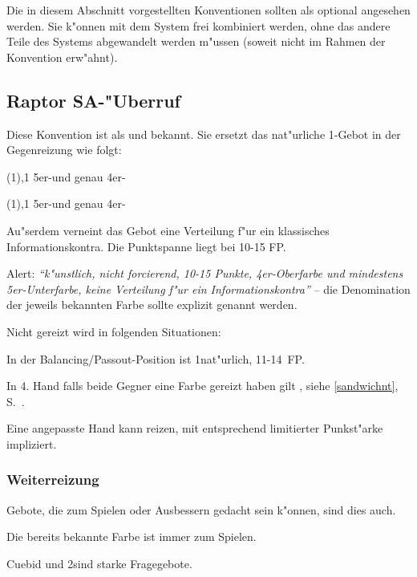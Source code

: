 \begin{appendix}
Die in diesem Abschnitt vorgestellten Konventionen sollten als optional
angesehen werden.  Sie k"onnen mit dem System frei kombiniert werden, ohne das
andere Teile des Systems abgewandelt werden m"ussen (soweit nicht im Rahmen der
Konvention erw"ahnt).

\subsection{Raptor SA-"Uberruf}

Diese Konvention ist als  und 
bekannt. Sie ersetzt das nat"urliche 1\SA-Gebot in der Gegenreizung wie folgt:

\bdsc
	\item[(1\uf)\sep{}1\SA] 5\pl{}er-\aufa und genau 4er-\ofa
	\item[(1\of)\sep{}1\SA] 5\pl{}er-\ufa und genau 4er-\aofa
\edsc

Au"serdem verneint das Gebot eine Verteilung f"ur ein klassisches
Informationskontra. Die Punktspanne liegt bei 10-15 FP.

Alert: \emph{"`k"unstlich, nicht forcierend, 10-15 Punkte, 4er-Oberfarbe und mindestens 5er-Unterfarbe, keine Verteilung f"ur ein Informationskontra"'} -- die Denomination der jeweils bekannten Farbe sollte explizit genannt werden.

Nicht gereizt wird  in folgenden Situationen:
\begin{compactitem}
\item In der Balancing/Passout-Position ist 1\SA na\-t"ur\-lich, 11-14~FP.
\item In 4. Hand falls beide Gegner eine Farbe gereizt haben gilt , siehe
\ref{sandwichnt}, S.~\pageref{sandwichnt}.
\end{compactitem}
Eine angepasste Hand kann  reizen, mit entsprechend limitierter
Punkst"arke impliziert.

\subsubsection{Weiterreizung}


\begin{compactitem}
	\item Gebote, die zum Spielen oder Ausbessern gedacht sein k"onnen, sind dies auch.
	\item Die bereits bekannte Farbe ist immer zum Spielen.
	\item Cuebid und 2\SA sind starke Fragegebote.
\end{compactitem}


\end{appendix}
